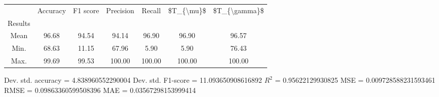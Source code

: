 \begin{tabular}{|c|c|c|c|c|c|c|}
\toprule
{} &  Accuracy &  F1 score &  Precision &  Recall &  \$T\_\{\textbackslash mu\}\$ &  \$T\_\{\textbackslash gamma\}\$ \\
Results &           &           &            &         &            &               \\
\hline
Mean    &     96.68 &     94.54 &      94.14 &   96.90 &      96.90 &         96.57 \\
Min.    &     68.63 &     11.15 &      67.96 &    5.90 &       5.90 &         76.43 \\
Max.    &     99.69 &     99.53 &     100.00 &  100.00 &     100.00 &        100.00 \\
\bottomrule
\end{tabular}

 Dev. std. accuracy = 4.838960552290004
 Dev. std. F1-score = 11.093650908616892
 $R^2$ = 0.95622129930825
 MSE = 0.009728588231593461
 RMSE = 0.09863360599508396
 MAE = 0.03567298153999414